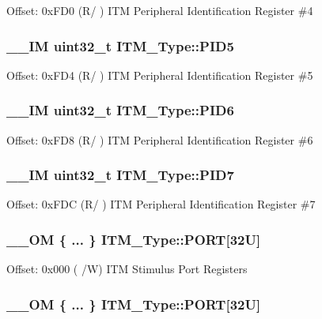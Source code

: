 Offset\-: 0x\-F\-D0 (R/ ) I\-T\-M Peripheral Identification Register \#4 \hypertarget{struct_i_t_m___type_af9085648bf18f69b5f9d1136d45e1d37}{
\subsubsection[{P\-I\-D5}]{\setlength{\rightskip}{0pt plus 5cm}\-\_\-\-\_\-\-I\-M uint32\-\_\-t I\-T\-M\-\_\-\-Type\-::\-P\-I\-D5}}\label{struct_i_t_m___type_af9085648bf18f69b5f9d1136d45e1d37}
Offset\-: 0x\-F\-D4 (R/ ) I\-T\-M Peripheral Identification Register \#5 \hypertarget{struct_i_t_m___type_ad34dbe6b1072c77d36281049c8b169f6}{
\subsubsection[{P\-I\-D6}]{\setlength{\rightskip}{0pt plus 5cm}\-\_\-\-\_\-\-I\-M uint32\-\_\-t I\-T\-M\-\_\-\-Type\-::\-P\-I\-D6}}\label{struct_i_t_m___type_ad34dbe6b1072c77d36281049c8b169f6}
Offset\-: 0x\-F\-D8 (R/ ) I\-T\-M Peripheral Identification Register \#6 \hypertarget{struct_i_t_m___type_a2bcec6803f28f30d5baf5e20e3517d3d}{
\subsubsection[{P\-I\-D7}]{\setlength{\rightskip}{0pt plus 5cm}\-\_\-\-\_\-\-I\-M uint32\-\_\-t I\-T\-M\-\_\-\-Type\-::\-P\-I\-D7}}\label{struct_i_t_m___type_a2bcec6803f28f30d5baf5e20e3517d3d}
Offset\-: 0x\-F\-D\-C (R/ ) I\-T\-M Peripheral Identification Register \#7 \hypertarget{struct_i_t_m___type_a1f61b04815065bea9ae1d2c4435fcd94}{
\subsubsection[{P\-O\-R\-T}]{\setlength{\rightskip}{0pt plus 5cm}\-\_\-\-\_\-\-O\-M \{ ... \}    I\-T\-M\-\_\-\-Type\-::\-P\-O\-R\-T\mbox{[}32\-U\mbox{]}}}\label{struct_i_t_m___type_a1f61b04815065bea9ae1d2c4435fcd94}
Offset\-: 0x000 ( /\-W) I\-T\-M Stimulus Port Registers \hypertarget{struct_i_t_m___type_ad14bee8adf4bcc5807610d664432350e}{
\subsubsection[{P\-O\-R\-T}]{\setlength{\rightskip}{0pt plus 5cm}\-\_\-\-\_\-\-O\-M \{ ... \}    I\-T\-M\-\_\-\-Type\-::\-P\-O\-R\-T\mbox{[}32\-U\mbox{]}}}\label{struct_i_t_m___type_ad14bee8adf4bcc5807610d664432350e}
